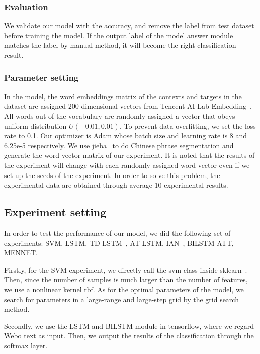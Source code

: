 \documentclass[runningheads, twocolumn]{llncs}
\begin{document}
\subsubsection{Evaluation}
We validate our model with the accuracy, and remove the label from test dataset before training the model. If the output label of the model answer module matches the label by manual method, it will become the right classification result.

\subsubsection{Parameter setting}
In the model, the word embeddings matrix of the contexts and targets in the dataset are assigned 200-dimensional vectors from Tencent AI Lab Embedding~\cite{DBLP:conf/naacl/SongSLZ18}. All words out of the vocabulary are randomly assigned a vector that obeys uniform distribution $U\left(-0.01, 0.01\right)$. To prevent data overfitting, we set the loss rate to 0.1. Our optimizer is Adam whose batch size and learning rate is 8 and 6.25e-5 respectively. We use jieba~\cite{sun2012jieba} to do Chinese phrase segmentation and generate the word vector matrix of our experiment. It is noted that the results of the experiment will change with each randomly assigned word vector even if we set up the seeds of the experiment. In order to solve this problem, the experimental data are obtained through average 10 experimental results.

\subsection{Experiment setting}
In order to test the performance of our model, we did the following set of experiments: SVM, LSTM, TD-LSTM~\cite{DBLP:conf/emnlp/WangHZZ16}, AT-LSTM\cite{DBLP:conf/emnlp/WangHZZ16}, IAN~\cite{DBLP:conf/ijcai/MaLZW17}, BILSTM-ATT, MENNET\cite{MENNET}.

Firstly, for the SVM experiment, we directly call the svm class inside sklearn~\cite{sklearn}. Then, since the number of samples is much larger than the number of features, we use a nonlinear kernel rbf. As for the optimal parameters of the model, we search for parameters in a large-range and large-step grid by the grid search method.

Secondly, we use the LSTM and BILSTM module in tensorflow, where we regard Webo text as input. Then, we output the results of the classification through the softmax layer.
\end{document}
